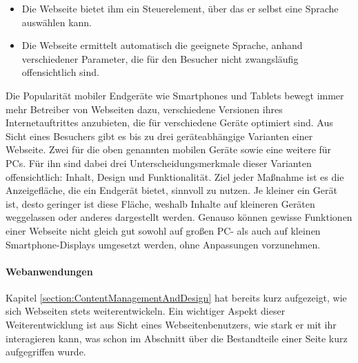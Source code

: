             \begin{itemize}
                \item   Die Webseite bietet ihm ein Steuerelement,
                        über das er selbst eine Sprache auswählen kann.
                \item   Die Webseite ermittelt automatisch die geeignete Sprache,
                        anhand verschiedener Parameter, die für den Besucher nicht zwangsläufig
                        offensichtlich sind.
            \end{itemize}

            Die Popularität mobiler Endgeräte wie Smartphones und Tablets
            bewegt immer mehr Betreiber von Webseiten dazu,
            verschiedene Versionen ihres Internetauftrittes anzubieten,
            die für verschiedene Geräte optimiert sind.
            Aus Sicht eines Besuchers gibt es bis zu drei geräteabhängige
            Varianten einer Webseite. Zwei für die oben genannten mobilen Geräte
            sowie eine weitere für PCs.
            Für ihn sind dabei drei Unterscheidungsmerkmale dieser Varianten offensichtlich:
            Inhalt, Design und Funktionalität.
            Ziel jeder Maßnahme ist es die Anzeigefläche,
            die ein Endgerät bietet, sinnvoll zu nutzen.
            Je kleiner ein Gerät ist, desto geringer ist diese Fläche,
            weshalb Inhalte auf kleineren Geräten weggelassen oder anderes
            dargestellt werden.
            Genauso können gewisse Funktionen einer Webseite nicht gleich
            gut sowohl auf großen PC- als auch auf kleinen Smartphone-Displays
            umgesetzt werden, ohne Anpassungen vorzunehmen.
            
            \paragraph*{Webanwendungen}
            Kapitel \ref{section:ContentManagementAndDesign} hat bereits
            kurz aufgezeigt, wie sich Webseiten stets weiterentwickeln.
            Ein wichtiger Aspekt dieser Weiterentwicklung ist aus Sicht
            eines Webseitenbenutzers, wie stark er mit ihr interagieren kann,
            was schon im Abschnitt über die Bestandteile einer Seite kurz aufgegriffen wurde.

